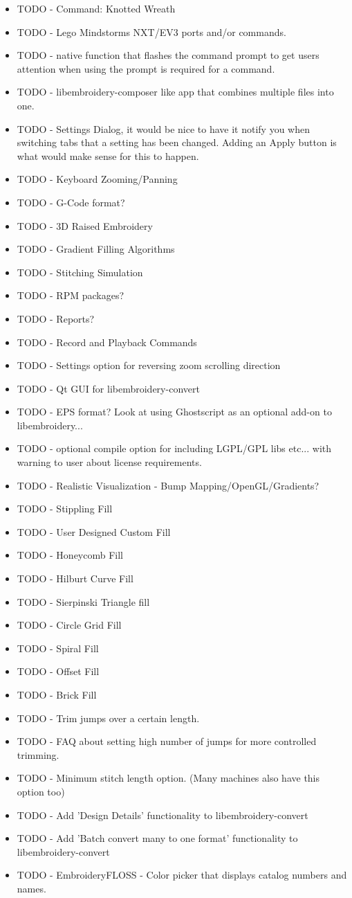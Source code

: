 \begin{itemize}
\item TODO - Command: Knotted Wreath
\item TODO - Lego Mindstorms NXT/EV3 ports and/or commands.
\item TODO - native function that flashes the command prompt to get users attention when using the prompt is required for a command.
\item TODO - libembroidery-composer like app that combines multiple files into one.
\item TODO - Settings Dialog, it would be nice to have it notify you when switching tabs that a setting has been changed. Adding an Apply button is what would make sense for this to happen. 
\item TODO - Keyboard Zooming/Panning
\item TODO - G-Code format?
\item TODO - 3D Raised Embroidery
\item TODO - Gradient Filling Algorithms
\item TODO - Stitching Simulation
\item TODO - RPM packages?
\item TODO - Reports?
\item TODO - Record and Playback Commands
\item TODO - Settings option for reversing zoom scrolling direction
\item TODO - Qt GUI for libembroidery-convert
\item TODO - EPS format? Look at using Ghostscript as an optional add-on to libembroidery...
\item TODO - optional compile option for including LGPL/GPL libs etc... with warning to user about license requirements.
\item TODO - Realistic Visualization - Bump Mapping/OpenGL/Gradients?
\item TODO - Stippling Fill
\item TODO - User Designed Custom Fill
\item TODO - Honeycomb Fill
\item TODO - Hilburt Curve Fill
\item TODO - Sierpinski Triangle fill
\item TODO - Circle Grid Fill
\item TODO - Spiral Fill
\item TODO - Offset Fill
\item TODO - Brick Fill
\item TODO - Trim jumps over a certain length.
\item TODO - FAQ about setting high number of jumps for more controlled trimming.
\item TODO - Minimum stitch length option. (Many machines also have this option too)
\item TODO - Add 'Design Details' functionality to libembroidery-convert
\item TODO - Add 'Batch convert many to one format' functionality to libembroidery-convert
\item TODO - EmbroideryFLOSS - Color picker that displays catalog numbers and names.
\end{itemize}

